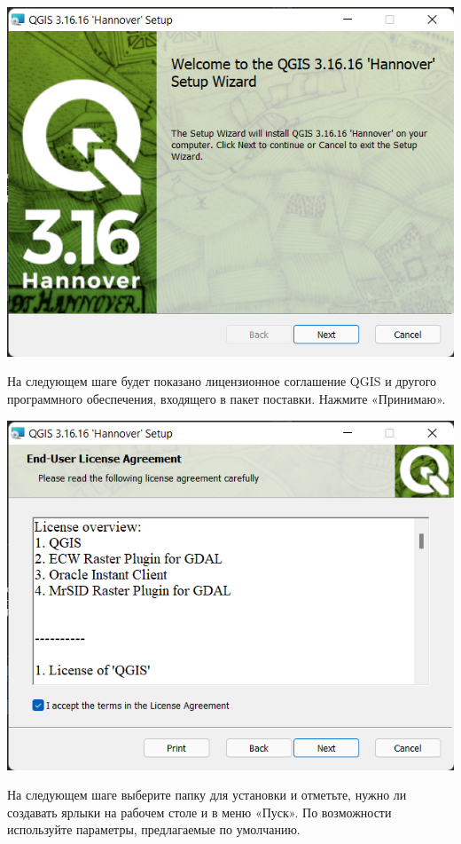 \documentclass[
  12pt,
]{book}
\begin{document}
\includegraphics{images/Index0/win01.png}

На следующем шаге будет показано лицензионное соглашение QGIS и другого программного обеспечения, входящего в пакет поставки. Нажмите «Принимаю».

\includegraphics{images/Index0/win02.png}

На следующем шаге выберите папку для установки и отметьте, нужно ли создавать ярлыки на рабочем столе и в меню «Пуск». По возможности используйте параметры, предлагаемые по умолчанию.
\end{document}
